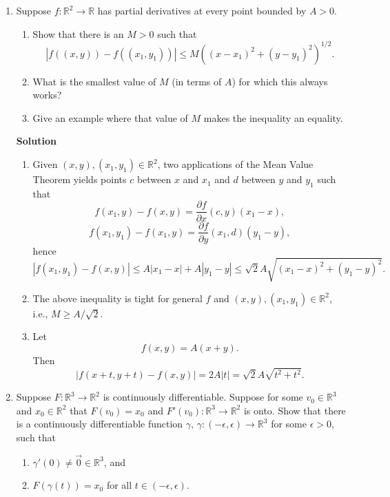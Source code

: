 \documentclass{article}
\begin{document}
\begin{enumerate}
\item Suppose \(f : \mathbb{R}^2 \to \mathbb{R}\) has partial derivatives at every point bounded by \(A > 0\).

\begin{enumerate}
\item Show that there is an \(M > 0\) such that
\[|f((x,y)) - f((x_1,y_1))| \leq M((x - x_1)^2 + (y - y_1)^2)^{1/2}.\]

\item What is the smallest value of \(M\) (in terms of \(A\)) for which this always works?

\item Give an example where that value of \(M\) makes the inequality an equality.

\end{enumerate}

{\bf Solution}

\begin{enumerate}
\item Given \((x,y), (x_1,y_1) \in \mathbb{R}^2\), two applications of the Mean Value Theorem yields points \(c\) between \(x\) and \(x_1\) and \(d\) between \(y\) and \(y_1\) such that
\[f(x_1,y) - f(x,y) = \frac{\partial f}{\partial x}(c,y)(x_1 - x),\]
\[f(x_1,y_1) - f(x_1,y) = \frac{\partial f}{\partial y}(x_1,d)(y_1 - y),\]
hence
\[|f(x_1,y_1) - f(x,y)| \leq A|x_1 - x| + A|y_1 - y| \leq \sqrt{2} A \sqrt{(x_1 - x)^2 + (y_1 - y)^2}.\]

\item The above inequality is tight for general \(f\) and \((x,y), (x_1,y_1) \in \mathbb{R}^2\), i.e., \(M \geq A/\sqrt{2}\).

\item Let
\[f(x,y) = A(x + y).\]
Then
\[|f(x + t,y + t) - f(x,y)| = 2A|t| = \sqrt{2} A \sqrt{t^2 + t^2}.\]

\end{enumerate}



\item Suppose \(F : \mathbb{R}^3 \to \mathbb{R}^2\) is continuously differentiable.  Suppose for some \(v_0 \in \mathbb{R}^3\) and \(x_0 \in \mathbb{R}^2\) that \(F(v_0) = x_0\) and \(F'(v_0) : \mathbb{R}^3 \to \mathbb{R}^2\) is onto.  Show that there is a continuously differentiable function \(\gamma\), \(\gamma : (-\epsilon,\epsilon) \to \mathbb{R}^3\) for some \(\epsilon > 0\), such that
\begin{enumerate}
\item \(\gamma'(0) \neq \vec{0} \in \mathbb{R}^3\), and
\item \(F(\gamma(t)) = x_0\) for all \(t \in (-\epsilon,\epsilon)\).
\end{enumerate}


\end{enumerate}
\end{document}
